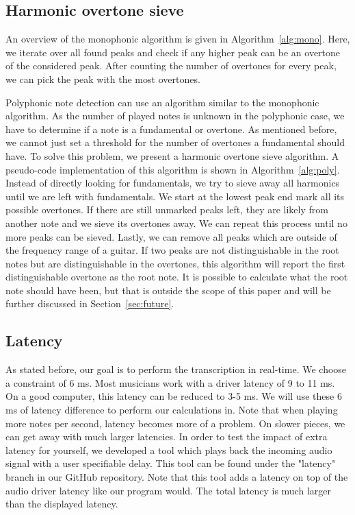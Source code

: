 \documentclass[10pt,twocolumn]{article}
\begin{document}
\subsection{Harmonic overtone sieve}  \label{sub:impnoteset}
An overview of the monophonic algorithm is given in Algorithm~\ref{alg:mono}. Here, we iterate over all found peaks and check if any higher peak can be an overtone of the considered peak. After counting the number of overtones for every peak, we can pick the peak with the most overtones.



Polyphonic note detection can use an algorithm similar to the monophonic algorithm. As the number of played notes is unknown in the polyphonic case, we have to determine if a note is a fundamental or overtone. As mentioned before, we cannot just set a threshold for the number of overtones a fundamental should have. To solve this problem, we present a harmonic overtone sieve algorithm. A pseudo-code implementation of this algorithm is shown in Algorithm~\ref{alg:poly}. Instead of directly looking for fundamentals, we try to sieve away all harmonics until we are left with fundamentals. We start at the lowest peak end mark all its possible overtones. If there are still unmarked peaks left, they are likely from another note and we sieve its overtones away. We can repeat this process until no more peaks can be sieved. Lastly, we can remove all peaks which are outside of the frequency range of a guitar. If two peaks are not distinguishable in the root notes but are distinguishable in the overtones, this algorithm will report the first distinguishable overtone as the root note. It is possible to calculate what the root note should have been, but that is outside the scope of this paper and will be further discussed in Section~\ref{sec:future}.

\subsection{Latency}  \label{sec:lat}
As stated before, our goal is to perform the transcription in real-time. We choose a constraint of 6 ms. Most musicians work with a driver latency of 9 to 11 ms. On a good computer, this latency can be reduced to 3-5 ms. We will use these 6 ms of latency difference to perform our calculations in. Note that when playing more notes per second, latency becomes more of a problem. On slower pieces, we can get away with much larger latencies. In order to test the impact of extra latency for yourself, we developed a tool which plays back the incoming audio signal with a user specifiable delay. This tool can be found under the "latency" branch in our GitHub repository. Note that this tool adds a latency on top of the audio driver latency like our program would. The total latency is much larger than the displayed latency.
\end{document}
